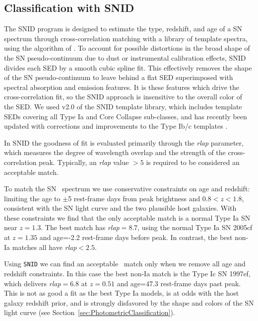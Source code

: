 \subsection{Classification with SNID}
\label{sec:SNID}

The SNID program is designed to estimate the type, redshift, and age
of a SN spectrum through cross-correlation matching with a library of
template spectra, using the algorithm of \citet{Tonry:1979}.
To account for possible distortions in the broad shape of the SN
pseudo-continuum due to dust or instrumental calibration effects, SNID
divides each SED by a smooth cubic spline fit. This effectively
removes the shape of the SN pseudo-continuum to leave behind a flat
SED superimposed with spectral absorption and emission features.  It
is these features which drive the cross-correlation fit, so the SNID
approach is insensitive to the overall color of the SED.  We used v2.0
of the SNID template library, which includes template SEDs covering
all Type Ia and Core Collapse sub-classes, and has recently been
updated with corrections and improvements to the Type Ib/c
templates \citep{Liu:2014}.

In SNID the goodness of fit is evaluated primarily through the {\it
rlap} parameter, which measures the degree of wavelength overlap and
the strength of the cross-correlation peak.  Typically, an {\it rlap}
value $>5$ is required to be considered an acceptable match.  

To match the SN \tomas\ spectrum we use conservative constraints on
age and redshift: limiting the age to $\pm$5 rest-frame days from peak
brightness and $0.8<z<1.8$, consistent with the SN light curve and
the two plausible host galaxies.  With these constraints we find that the only
acceptable match is a normal Type Ia SN near $z=1.3$. The best match
has {\it rlap}$=8.7$, using the normal Type Ia SN 2005cf at $z=1.35$
and age=-2.2 rest-frame days before peak.  In contrast, 
the best non-Ia matches all have {\it rlap}$<2.5$.

Using {\tt SNID} we can find an acceptable \CCSN\ match only
when we remove all age and redshift constraints. In this case the best
non-Ia match is the Type Ic SN 1997ef, which delivers {\it rlap}$=6.8$
at $z=0.51$ and age=47.3 rest-frame days past peak.  This is not as
good a fit as the best Type Ia models, is at odds with the host galaxy
redshift prior, and is strongly disfavored by the shape and colors of
the SN light curve (see Section~\ref{sec:PhotometricClassification}).  


